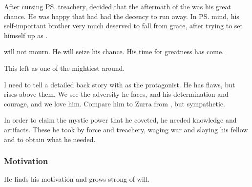 After cursing \ps{\Ishnaruchaefir} treachery, \Secherdamon{} decided that the aftermath of the \secondbanewar{} was his great chance. 
He was happy that \Ishnaruchaefir{} had had the decency to run away. 
In \ps{\Secherdamon} mind, his self-important brother very much deserved to fall from grace, after trying to set himself up as \dragonlord. 


\Secherdamon{} will not mourn. 
He will seize his chance. 
His time for greatness has come. 



This left \Secherdamon{} as one of the mightiest \dragons{} around. 

I need to tell a detailed back story with \Secherdamon{} as the protagonist. 
He has flaws, but rises above them. 
We see the adversity he faces, and his determination and courage, and we love him. 
Compare him to Zurra from , but sympathetic.

In order to claim the mystic power that he coveted, he needed  knowledge and artifacts. 
These he took by force and treachery, waging war and slaying his fellow \dragons{} and \ophidian{} to obtain what he needed.





\subsubsection{Motivation}
He finds his motivation and grows strong of will.


